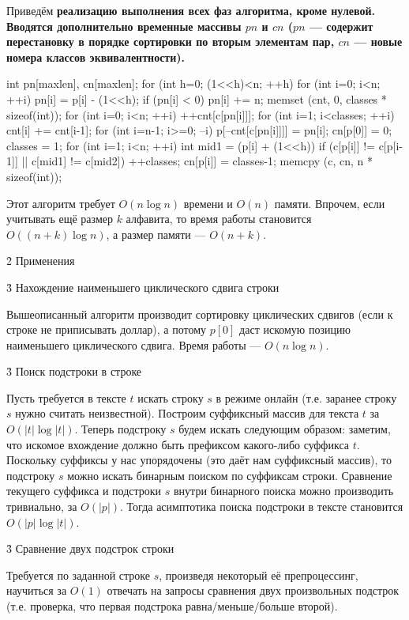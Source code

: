 Приведём \bf{реализацию} выполнения всех фаз алгоритма, кроме нулевой. Вводятся дополнительно временные массивы $pn$ и $cn$ ($pn$ --- содержит перестановку в порядке сортировки по вторым элементам пар, $cn$ --- новые номера классов эквивалентности).

\code
int pn[maxlen], cn[maxlen];
for (int h=0; (1<<h)<n; ++h) {
	for (int i=0; i<n; ++i) {
		pn[i] = p[i] - (1<<h);
		if (pn[i] < 0)  pn[i] += n;
	}
	memset (cnt, 0, classes * sizeof(int));
	for (int i=0; i<n; ++i)
		++cnt[c[pn[i]]];
	for (int i=1; i<classes; ++i)
		cnt[i] += cnt[i-1];
	for (int i=n-1; i>=0; --i)
		p[--cnt[c[pn[i]]]] = pn[i];
	cn[p[0]] = 0;
	classes = 1;
	for (int i=1; i<n; ++i) {
		int mid1 = (p[i] + (1<<h)) %
		if (c[p[i]] != c[p[i-1]] || c[mid1] != c[mid2])
			++classes;
		cn[p[i]] = classes-1;
	}
	memcpy (c, cn, n * sizeof(int));
}
\endcode

Этот алгоритм требует $O(n \log n)$ времени и $O(n)$ памяти. Впрочем, если учитывать ещё размер $k$ алфавита, то время работы становится $O((n+k) \log n)$, а размер памяти --- $O(n+k)$.


\h2{ Применения }


\h3{ Нахождение наименьшего циклического сдвига строки }

Вышеописанный алгоритм производит сортировку циклических сдвигов (если к строке не приписывать доллар), а потому $p[0]$ даст искомую позицию наименьшего циклического сдвига. Время работы --- $O(n \log n)$.


\h3{ Поиск подстроки в строке }

Пусть требуется в тексте $t$ искать строку $s$ в режиме онлайн (т.е. заранее строку $s$ нужно считать неизвестной). Построим суффиксный массив для текста $t$ за $O (|t| \log |t|)$. Теперь подстроку $s$ будем искать следующим образом: заметим, что искомое вхождение должно быть префиксом какого-либо суффикса $t$. Поскольку суффиксы у нас упорядочены (это даёт нам суффиксный массив), то подстроку $s$ можно искать бинарным поиском по суффиксам строки. Сравнение текущего суффикса и подстроки $s$ внутри бинарного поиска можно производить тривиально, за $O(|p|)$. Тогда асимптотика поиска подстроки в тексте становится $O(|p| \log |t|)$.


\h3{ Сравнение двух подстрок строки }

Требуется по заданной строке $s$, произведя некоторый её препроцессинг, научиться за $O(1)$ отвечать на запросы сравнения двух произвольных подстрок (т.е. проверка, что первая подстрока равна/меньше/больше второй).

